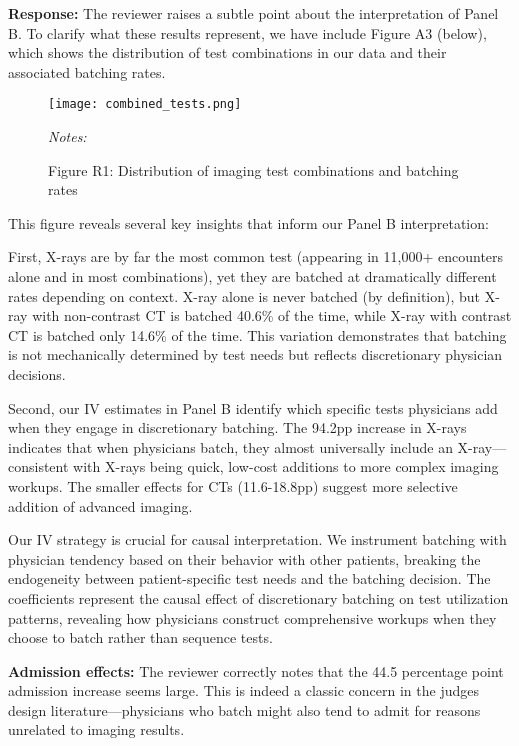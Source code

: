 \documentclass[11pt]{article}
\newcommand{\1}{\hbox{\rm 1\kern-.35em 1}}
\begin{document}
{{{{\noindent\textbf{Response:} \color{blue}
The reviewer raises a subtle point about the interpretation of Panel B. To clarify what these results represent, we have include Figure A3 (below), which shows the distribution of test combinations in our data and their associated batching rates.

\begin{figure}[ht]
\centering
\begin{threeparttable}
\caption*{Figure R1: Distribution of imaging test combinations and batching rates}
\texttt{[image: combined\_tests.png]}
    \label{fig:consort}
    \begin{tablenotes}
        \small
        \item \textit{Notes:} 
    \end{tablenotes}
\end{threeparttable}
\end{figure}


This figure reveals several key insights that inform our Panel B interpretation:

First, X-rays are by far the most common test (appearing in 11,000+ encounters alone and in most combinations), yet they are batched at dramatically different rates depending on context. X-ray alone is never batched (by definition), but X-ray with non-contrast CT is batched 40.6\% of the time, while X-ray with contrast CT is batched only 14.6\% of the time. This variation demonstrates that batching is not mechanically determined by test needs but reflects discretionary physician decisions.

Second, our IV estimates in Panel B identify which specific tests physicians add when they engage in discretionary batching. The 94.2pp increase in X-rays indicates that when physicians batch, they almost universally include an X-ray—consistent with X-rays being quick, low-cost additions to more complex imaging workups. The smaller effects for CTs (11.6-18.8pp) suggest more selective addition of advanced imaging.

Our IV strategy is crucial for causal interpretation. We instrument batching with physician tendency based on their behavior with other patients, breaking the endogeneity between patient-specific test needs and the batching decision. The coefficients represent the causal effect of discretionary batching on test utilization patterns, revealing how physicians construct comprehensive workups when they choose to batch rather than sequence tests.


\textbf{Admission effects:}
The reviewer correctly notes that the 44.5 percentage point admission increase seems large. This is indeed a classic concern in the judges design literature—physicians who batch might also tend to admit for reasons unrelated to imaging results.

}}}}
\end{document}

